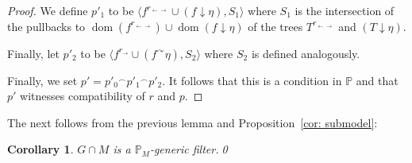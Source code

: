 \documentclass[11pt]{amsart}
\newtheorem{corollary}[theorem]{Corollary}
\theoremstyle{definition}
\theoremstyle{remark}
\newtheorem{remark}[theorem]{Remark}
\newcommand\cat[1]{{}^\curvearrowright #1}
\DeclareMathOperator{\dom}{dom}
\begin{document}
\begin{proof}
We define $p'_1$ to be $\langle f^{r_{\leftarrow\rightarrow}}\cup (f\downarrow \eta), S_1\rangle$ where $S_1$ is the intersection of the pullbacks to  $\dom(f^{r_{\leftarrow\rightarrow}})\cup \dom(f\downarrow\eta)$ of the trees $T^{r_{\leftarrow\rightarrow}}$ and $(T\downarrow\eta)$. 

Finally, let $p'_2$ to be $\langle f^{r_{\rightarrow}}\cup (f\cat \eta), S_2\rangle$ where $S_2$ is defined analogously.

Finally, we set $p'=p'_0{}^\smallfrown p'_1{}^\smallfrown p'_2$. It follows that this is a condition in $\mathbb{P}$ and that $p'$ witnesses compatibility of $r$ and $p$.
\end{proof}
The next follows from the previous lemma and Proposition~\ref{cor: submodel}:
\begin{corollary}
    $G\cap M$ is a $\mathbb{P}_M$-generic filter.\qed
\end{corollary}
\end{document}
